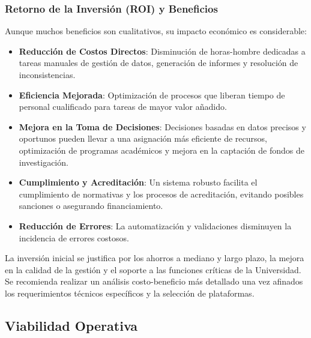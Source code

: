 \subsubsection{Retorno de la Inversión (ROI) y Beneficios} Aunque muchos beneficios son cualitativos, su impacto económico es considerable:
\begin{itemize}
    \item \textbf{Reducción de Costos Directos}: Disminución de horas-hombre dedicadas a tareas manuales de gestión de datos, generación de informes y resolución de inconsistencias.
\item \textbf{Eficiencia Mejorada}: Optimización de procesos que liberan tiempo de personal cualificado para tareas de mayor valor añadido.
\item \textbf{Mejora en la Toma de Decisiones}: Decisiones basadas en datos precisos y oportunos pueden llevar a una asignación más eficiente de recursos, optimización de programas académicos y mejora en la captación de fondos de investigación.
\item \textbf{Cumplimiento y Acreditación}: Un sistema robusto facilita el cumplimiento de normativas y los procesos de acreditación, evitando posibles sanciones o asegurando financiamiento.
\item \textbf{Reducción de Errores}: La automatización y validaciones disminuyen la incidencia de errores costosos.
\end{itemize}
La inversión inicial se justifica por los ahorros a mediano y largo plazo, la mejora en la calidad de la gestión y el soporte a las funciones críticas de la Universidad. Se recomienda realizar un análisis costo-beneficio más detallado una vez afinados los requerimientos técnicos específicos y la selección de plataformas.

\subsection{Viabilidad Operativa}

